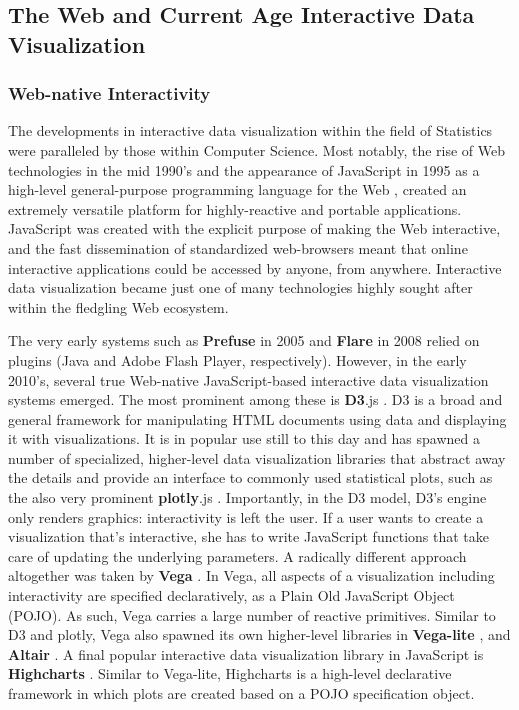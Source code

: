 \documentclass[12pt,a4paper]{article}
\begin{document}
\subsection{The Web and Current Age Interactive Data Visualization}
\label{sec:currentage}

\subsubsection{Web-native Interactivity}

The developments in interactive data visualization within the field of Statistics were paralleled by those within Computer Science. Most notably, the rise of Web technologies in the mid 1990's and the appearance of JavaScript in 1995 as a high-level general-purpose programming language for the Web \citep[for a description of the history, see e.g.][]{wirfs-brock2020}, created an extremely versatile platform for highly-reactive and portable applications. JavaScript was created with the explicit purpose of making the Web interactive, and the fast dissemination of standardized web-browsers meant that online interactive applications could be accessed by anyone, from anywhere. Interactive data visualization became just one of many technologies highly sought after within the fledgling Web ecosystem. 

The very early systems such as \textbf{Prefuse} in 2005 \citep{heer2005} and \textbf{Flare} in 2008 \citep{flare2020} relied on plugins (Java and Adobe Flash Player, respectively). However, in the early 2010's, several true Web-native JavaScript-based interactive data visualization systems emerged. The most prominent among these is \textbf{D3}.js \citep{bostock2011}. D3 is a broad and general framework for manipulating HTML documents using data and displaying it with visualizations. It is in popular use still to this day and has spawned a number of specialized, higher-level data visualization libraries that abstract away the details and provide an interface to commonly used statistical plots, such as the also very prominent \textbf{plotly}.js \citep{plotly2022}. Importantly, in the D3 model, D3's engine only renders graphics: interactivity is left the user. If a user wants to create a visualization that's interactive, she has to write JavaScript functions that take care of updating the underlying parameters. A radically different approach altogether was taken by \textbf{Vega} \citep{satyanarayan2015}. In Vega, all aspects of a visualization including interactivity are specified declaratively, as a Plain Old JavaScript Object (POJO). As such, Vega carries a large number of reactive primitives. Similar to D3 and plotly, Vega also spawned its own higher-level libraries in \textbf{Vega-lite} \citep{satyanarayan2016}, and \textbf{Altair} \citep{vanderplas2018}. A final popular interactive data visualization library in JavaScript is \textbf{Highcharts} \citep{highcharts2023}. Similar to Vega-lite, Highcharts is a high-level declarative framework in which plots are created based on a POJO specification object. 
\end{document}
